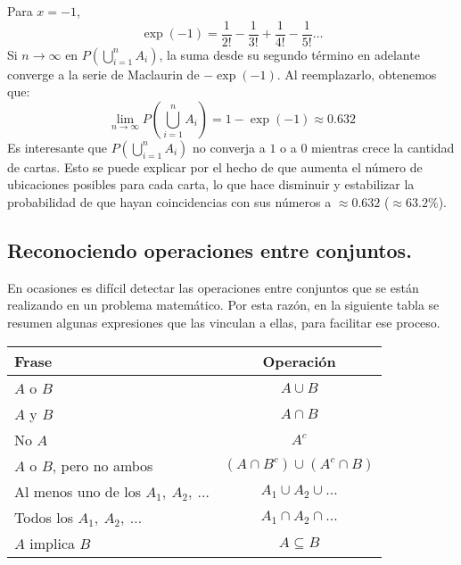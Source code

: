 \documentclass[12pt]{article}
\begin{document}
Para $x = -1$,
\[
  \exp(-1) = \frac{1}{2!} - \frac{1}{3!} + \frac{1}{4!} - \frac{1}{5!} \ldots
\]
Si $n \to \infty$ en $P(\bigcup_{i = 1}^{n} A_{i})$, la suma desde su segundo término en adelante converge a la serie de Maclaurin de $- \exp(-1)$. Al reemplazarlo, obtenemos que:
\[
  \lim_{n \to \infty} P\left(\bigcup_{i = 1}^{n} A_{i}\right) = 1 - \exp(-1) \approx 0.632
\]
Es interesante que $P\left(\bigcup_{i = 1}^{n} A_{i}\right)$ no converja a $1$ o a $0$ mientras crece la cantidad de cartas. Esto se puede explicar por el hecho de que aumenta el número de ubicaciones posibles para cada carta, lo que hace disminuir y estabilizar la probabilidad de que hayan coincidencias con sus números a $\approx 0.632$ ($\approx 63.2\%$).

\subsection{Reconociendo operaciones entre conjuntos.}

En ocasiones es difícil detectar las operaciones entre conjuntos que se están realizando en un problema matemático. Por esta razón, en la siguiente tabla se resumen algunas expresiones que las vinculan a ellas, para facilitar ese proceso.

\begin{table}[hbt!]
\centering

\begin{tabular}{l c}
\hline
Frase & Operación \\
\hline
$A$ o $B$ & $A \cup B$ \\
$A$ y $B$ & $A \cap B$ \\
No $A$ & $A^{c}$ \\
$A$ o $B$, pero no ambos & $(A \cap B^{c}) \cup (A^{c} \cap B)$ \\
Al menos uno de los $A_{1}, \ A_{2}, \ \ldots$ & $A_{1} \cup A_{2} \cup \ldots$ \\
Todos los $A_{1}, \ A_{2}, \ \ldots$ & $A_{1} \cap A_{2} \cap \ldots$ \\
$A$ implica $B$ & $A \subseteq B$ \\
\hline
\end{tabular}

\end{table}
\end{document}
